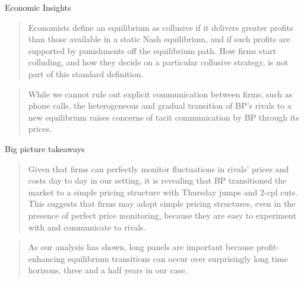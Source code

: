 \documentclass[dvipsnames]{beamer}
\begin{document}
  \begin{frame}{Economic Insights}
    \begin{quote}
     Economists define an equilibrium as collusive if it delivers greater profits than those available in a static Nash equilibrium, and if such profits are supported by punishments off the equilibrium path. How firms start colluding, and how they decide on a particular collusive strategy, is not part of this standard definition. 
    \end{quote}
    \vfill
    \begin{quote}
      While we cannot rule out explicit communication between firms, such as phone calls, the heterogeneous and gradual transition of BP's rivals to a new equilibrium raises concerns of tacit communication by BP through its prices.
    \end{quote}
    \vfill
  \end{frame}
  \begin{frame}{Big picture takeaways}
    \begin{quote}
      Given that firms can perfectly monitor fluctuations in rivals' prices and costs day to day in our setting, it is revealing that BP transitioned the market to a simple pricing structure with Thursday jumps and 2-cpl cuts. This suggests that firms may adopt simple pricing structures, even in the presence of perfect price monitoring, because they are easy to experiment with and communicate to rivals.
    \end{quote}
    \vfill
    \begin{quote}
      As our analysis has shown, long panels are important because profit-enhancing equilibrium transitions can occur over surprisingly long time horizons, three and a half years in our case.
    \end{quote}
    \vfill
  \end{frame}
\end{document}
